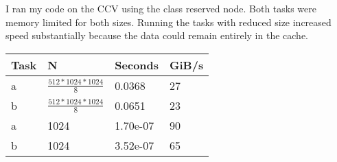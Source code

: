 \documentclass{article}
\begin{document}
I ran my code on the CCV using the class reserved node.
Both tasks were memory limited for both sizes. Running the tasks with reduced size increased speed
substantially because the data could remain entirely in the cache.

\begin{table}[h!]
\begin{tabular}{|l|l|l|l|}
\hline
Task & N                                      & Seconds  & GiB/s \\ \hline
a    & $\frac{512*1024*1024}8$ & 0.0368   & 27   \\ \hline
b    & $\frac{512*1024*1024}8$ & 0.0651   & 23   \\ \hline
a    & 1024                                   & 1.70e-07 & 90   \\ \hline
b    & 1024                                   & 3.52e-07 & 65   \\ \hline
\end{tabular}
\end{table}
\end{document}
